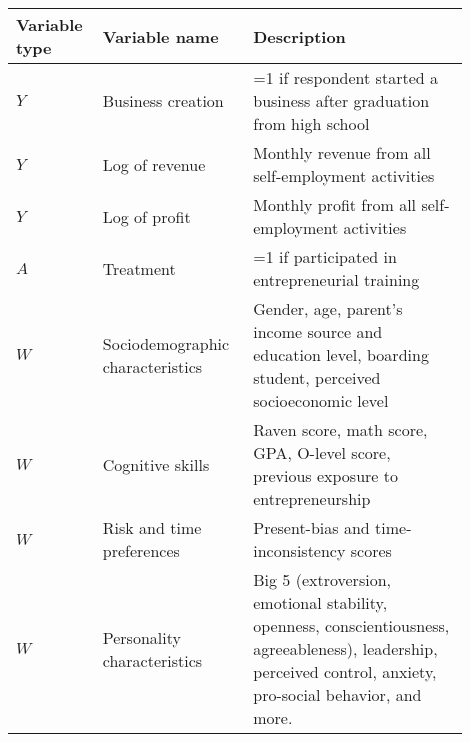 
\begin{center}
\begin{tabular}{ | p{0.15\linewidth} | p{0.3\linewidth} |  p{0.45\linewidth} | } 
 \hline
 Variable type & Variable name & Description \\ 

\hline
 $Y$ & Business creation & =1 if respondent started a business after graduation from high school \\ 

\hline
 $Y$ &Log of revenue & Monthly revenue from all self-employment activities \\ 

\hline 
$Y$ & Log of profit & Monthly profit from all self-employment activities \\

\hline
$A$ & Treatment & =1 if participated in entrepreneurial training \\

\hline
$W$ & Sociodemographic characteristics & Gender, age, parent’s income source and education level, boarding student, perceived socioeconomic level \\

\hline
$W$ & Cognitive skills & Raven score, math score, GPA, O-level score, previous exposure to entrepreneurship  \\

\hline
$W$ & Risk and time preferences & Present-bias and time-inconsistency scores \\

\hline
$W$ & Personality characteristics & Big 5 (extroversion, emotional stability, openness, conscientiousness, agreeableness), leadership, perceived control, anxiety, pro-social behavior, and more. \\

 \hline
\end{tabular}
\end{center}

